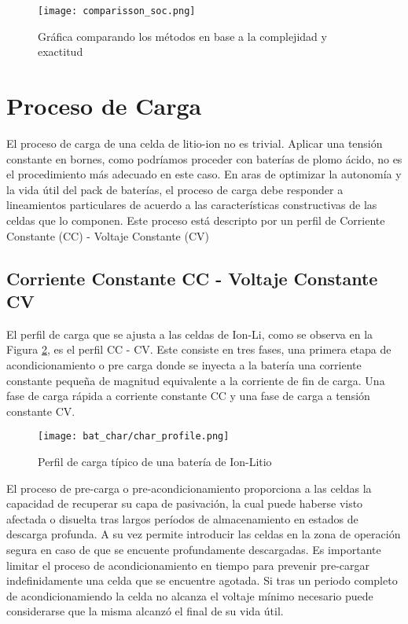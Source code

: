 \begin{figure}[h!]
    \begin{center}
        \texttt{[image: comparisson\_soc.png]}
        \caption{Gr\'afica comparando los m\'etodos en base a la complejidad y
        exactitud}
        \label{comp_error_soc}
    \end{center}
\end{figure}

\section{Proceso de Carga}\label{sec:tecnica_carga}

El proceso de carga de una celda de litio-ion no es trivial. Aplicar una tensión
constante en  bornes, como podríamos proceder con baterías de plomo ácido, no es
el procedimiento más adecuado en este caso. En aras de optimizar la autonomía y
la vida útil del pack de baterías, el proceso de carga debe responder a
lineamientos particulares de acuerdo a las características constructivas de las
celdas que lo componen. Este proceso est\'a descripto por un perfil de Corriente
Constante (CC) - Voltaje Constante (CV)

\subsection{Corriente Constante CC - Voltaje Constante CV}

El perfil de carga que se ajusta a las celdas de \acrshort{Ion-Li}, como se
observa en la Figura \ref{fig:char_prof}, es el perfil \acrshort{CC} -
\acrshort{CV}. Este consiste en tres fases, una primera etapa de
acondicionamiento o pre carga donde se inyecta a la batería una corriente
constante pequeña de magnitud equivalente a la corriente de fin de carga. Una
fase de carga rápida a corriente constante \acrshort{CC} y una fase de carga a 
tensión constante \acrshort{CV}.

\begin{figure}[h!] \centering
    \texttt{[image: bat\_char/char\_profile.png]}
    \caption{Perfil de carga típico de una batería de Ion-Litio}
\label{fig:char_prof} \end{figure} \FloatBarrier

El proceso de pre-carga o pre-acondicionamiento proporciona a las celdas la
capacidad de recuperar su capa de pasivación, la cual puede haberse visto
afectada o disuelta tras largos per\'iodos de almacenamiento en estados de
descarga profunda. A su vez permite introducir las celdas en la zona de
operación segura en caso de que se encuente profundamente descargadas. Es
importante limitar el proceso de acondicionamiento en tiempo para prevenir 
pre-cargar indefinidamente una celda que se encuentre agotada. Si tras un 
periodo completo de acondicionamiendo la celda no alcanza el voltaje mínimo 
necesario puede considerarse que la misma alcanzó el final de su vida útil.

